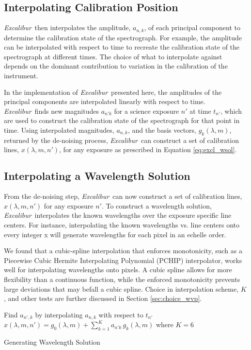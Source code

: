 \documentclass[modern]{aastex63}
\newcommand{\project}[1]{\textsl{#1}}
\newcommand{\name}{\project{Excalibur}}
\begin{document}
\subsection{Interpolating Calibration Position}
 \label{sec:interp_time}
\name\ then interpolates the amplitude, $a_{n,k}$, of each principal component to determine the calibration state of the spectrograph.  For example, the amplitude can be interpolated with respect to time to recreate the calibration state of the spectrograph at different times.  The choice of what to interpolate against depends on the dominant contribution to variation in the calibration of the instrument.

In the implementation of \name\ presented here, the amplitudes of the principal components are interpolated linearly with respect to time.  \name\ finds new magnitudes $a_{n'k}$ for a science exposure $n'$ at time $t_{n'}$, which are used to construct the calibration state of the spectrograph for that point in time.  Using interpolated magnitudes, $a_{n,k}$, and the basis vectors, $g_k(\lambda,m)$, returned by the de-noising process, \name\ can construct a set of calibration lines, $x(\lambda,m,n') $, for any exposure as prescribed in Equation \ref{eq:excl_wsol}.


\subsection{Interpolating a Wavelength Solution} \label{sec:interp_wsol}
From the de-noising step, \name\ can now construct a set of calibration lines, $x(\lambda,m,n')$ for any exposure $n'$.  To construct a wavelength solution, \name\ interpolates the known wavelengths over the exposure specific line centers.  For instance, interpolating the known wavelengths vs. line centers onto every integer x will generate wavelengths for each pixel in an echelle order.

We found that a cubic-spline interpolation that enforces monotonicity, such as a Piecewise Cubic Hermite Interpolating Polynomial (PCHIP) interpolator, works well for interpolating wavelengths onto pixels.  A cubic spline allows for more flexibility than a continuous function, while the enforced monotonicity prevents large deviations that may befall a cubic spline.  Choice in interpolation scheme, $K$, and other tests are further discussed in Section \ref{sec:choice_wvp}.

\begin{algorithm}
\SetAlgoLined
{}

Find $a_{n',k}$ by interpolating $a_{n,k}$ with respect to $t_{n'}$\;
$x(\lambda,m,n') = g_0(\lambda,m) + \sum_{k=1}^K a_{n'k}\,g_k(\lambda,m)$ where $K=6$\;
\caption{Generating Wavelength Solution}
\end{algorithm}
\end{document}

